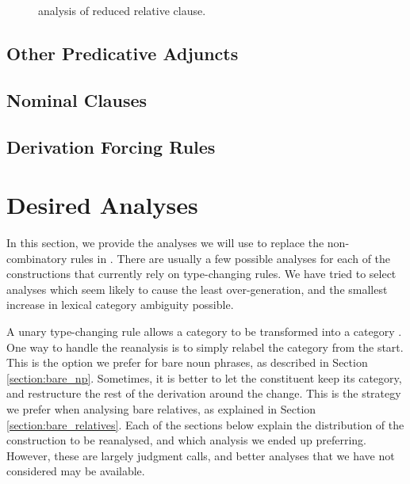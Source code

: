 \begin{figure}[t]
\caption{\ccgbank analysis of reduced relative clause.}\label{ccgbank_obj_rel}
\end{figure}

\subsection{Other Predicative Adjuncts}


\subsection{Nominal Clauses}


\subsection{Derivation Forcing Rules}



\section{Desired Analyses}

In this section, we provide the \ccg analyses we will use to replace the non-combinatory rules in \ccgbank. There are usually a few possible \ccg analyses for each of the constructions that currently rely on type-changing rules. We have tried to select analyses which seem likely to cause the least over-generation, and the smallest increase in lexical category ambiguity possible.

A unary type-changing rule allows a category  to be transformed into a category . One way to handle the reanalysis is to simply relabel the category  from the start. This is the option we prefer for bare noun phrases, as described in Section \ref{section:bare_np}. Sometimes, it is better to let the constituent keep its  category, and restructure the rest of the derivation around the change. This is the strategy we prefer when analysing bare relatives, as explained in Section \ref{section:bare_relatives}. Each of the sections below explain the distribution of the construction to be reanalysed, and which analysis we ended up preferring. However, these are largely judgment calls, and better analyses that we have not considered may be available.


